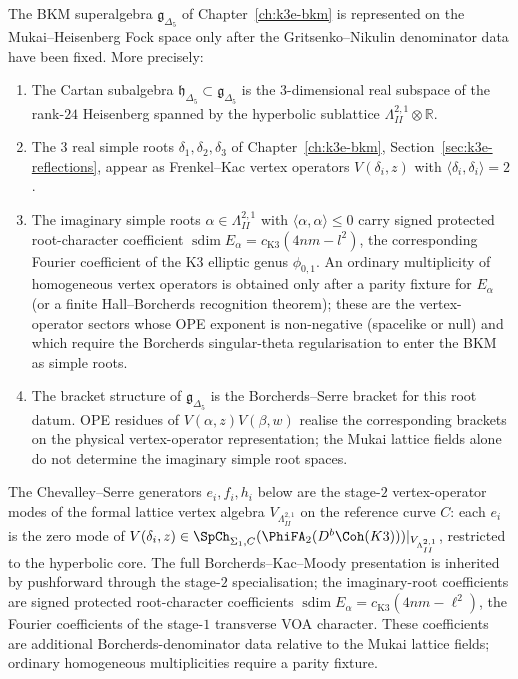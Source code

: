 \begin{corollary}
\label{cor:g-delta5-fk-closure}
The BKM superalgebra $\mathfrak{g}_{\Delta_5}$ of Chapter~\ref{ch:k3e-bkm} is
represented on the Mukai--Heisenberg Fock space only after the
Gritsenko--Nikulin denominator data have been fixed. More precisely:
\begin{enumerate}[label=\textup{(\roman*)}]
\item The Cartan subalgebra $\mathfrak{h}_{\Delta_5}\subset\mathfrak{g}_{\Delta_5}$
 is the $3$-dimensional real subspace of the rank-$24$ Heisenberg spanned by
 the hyperbolic sublattice $\Lambda^{2,1}_{II}\otimes\mathbb{R}$.
\item The $3$ real simple roots $\delta_1,\delta_2,\delta_3$ of
 Chapter~\ref{ch:k3e-bkm}, Section~\ref{sec:k3e-reflections}, appear as
 Frenkel--Kac vertex operators $V(\delta_i,z)$ with $\langle\delta_i,\delta_i\rangle = 2$.
\item The imaginary simple roots $\alpha\in\Lambda^{2,1}_{II}$ with
 $\langle\alpha,\alpha\rangle\leq 0$ carry signed protected
 root-character coefficient
 $\operatorname{sdim}E_\alpha = c_{\mathrm{K3}}(4nm-l^2)$, the
 corresponding Fourier coefficient of the K3 elliptic genus
 $\phi_{0,1}$. An ordinary multiplicity of homogeneous vertex
 operators is obtained only after a parity fixture for $E_\alpha$ (or a
 finite Hall--Borcherds recognition theorem); these are the
 vertex-operator sectors whose OPE exponent is non-negative
 (spacelike or null) and which require the Borcherds singular-theta
 regularisation to enter the BKM as simple roots.
\item The bracket structure of $\mathfrak{g}_{\Delta_5}$ is the
 Borcherds--Serre bracket for this root datum. OPE residues of
 $V(\alpha,z)V(\beta,w)$ realise the corresponding brackets on the
 physical vertex-operator representation; the Mukai lattice fields alone do not
 determine the imaginary simple root spaces.
\end{enumerate}
\end{corollary}

\begin{remark}
\label{rem:k3y-stage-chevalley-bkm}
The Chevalley--Serre generators $e_i, f_i, h_i$ below are the
stage-$2$ vertex-operator modes of the formal lattice vertex algebra
$V_{\Lambda^{2,1}_{II}}$ on the reference curve $C$: each $e_i$ is
the zero mode of $V(\delta_i, z) \in
\SpCh_{\Sigma_1, C}(\PhiFA_2(D^b\Coh(K3)))|_{V_{\Lambda^{2,1}_{II}}}$,
restricted to the hyperbolic core. The full Borcherds--Kac--Moody
presentation is inherited by pushforward through the stage-$2$
specialisation; the imaginary-root coefficients
are signed protected root-character coefficients
\(\operatorname{sdim}E_\alpha
= c_{\mathrm{K3}}(4nm-\ell^2)\), the Fourier coefficients of the
stage-$1$ transverse VOA character. These coefficients are additional
Borcherds-denominator data relative to the Mukai lattice fields; ordinary
homogeneous multiplicities require a parity fixture.
\end{remark}


